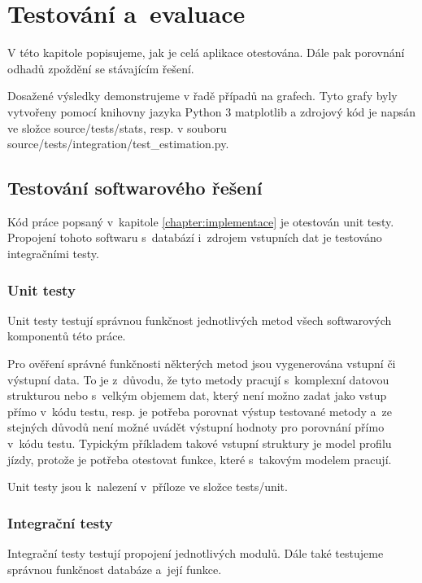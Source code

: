 

\chapter{Testování a~evaluace}


V této kapitole popisujeme, jak je celá aplikace otestována. Dále pak porovnání odhadů zpoždění se stávajícím řešení.

\bigbreak

Dosažené výsledky demonstrujeme v řadě případů na grafech. Tyto grafy byly vytvořeny pomocí knihovny jazyka Python 3 matplotlib a zdrojový kód je napsán ve složce source/tests/stats, resp. v souboru source/tests/integration/test_estimation.py.

\section{Testování softwarového řešení}

Kód práce popsaný v~kapitole \ref{chapter:implementace} je otestován unit testy. Propojení tohoto softwaru s~databází i~zdrojem vstupních dat je testováno integračními testy.


\subsection{Unit testy}

Unit testy testují správnou funkčnost jednotlivých metod všech softwarových komponentů této práce.

\bigbreak

Pro ověření správné funkčnosti některých metod jsou vygenerována vstupní či výstupní data. To je z~důvodu, že tyto metody pracují s~komplexní datovou strukturou nebo s~velkým objemem dat, který není možno zadat jako vstup přímo v~kódu testu, resp. je potřeba porovnat výstup testované metody a~ze stejných důvodů není možné uvádět výstupní hodnoty pro porovnání přímo v~kódu testu. Typickým příkladem takové vstupní struktury je model profilu jízdy, protože je potřeba otestovat funkce, které s~takovým modelem pracují.

\bigbreak

Unit testy jsou k~nalezení v~příloze ve složce tests/unit.


\subsection{Integrační testy}

Integrační testy testují propojení jednotlivých modulů. Dále také testujeme správnou funkčnost databáze a~její funkce.

